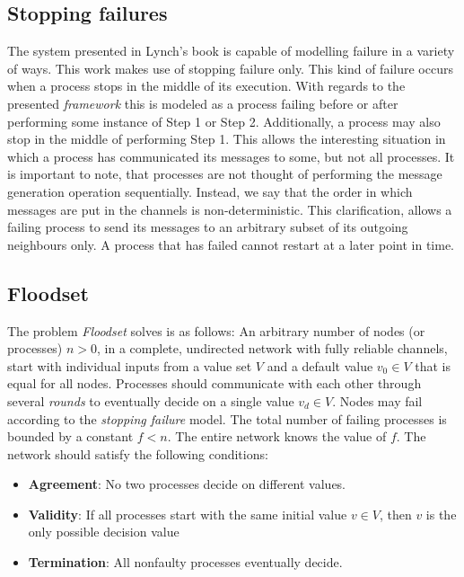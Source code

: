 \documentclass[fleqn]{article}
\begin{document}
\subsection{Stopping failures}
The system presented in Lynch's book \cite{refNancy} is capable of modelling failure in a variety of ways.
This work makes use of stopping failure only. This kind of failure occurs when a process stops in the middle of its execution. With regards to the presented \textit{framework} this
is modeled as a process failing before or after performing some instance of Step 1 or Step 2. Additionally, a process may also stop in the middle of performing Step 1. This allows
the interesting situation in which a process has communicated its messages to some, but not all processes. It is important to note, that processes are not thought of performing
the message generation operation sequentially. Instead, we say that the order in which messages are put in the channels is non-deterministic. This clarification, allows a failing process
to send its messages to an arbitrary subset of its outgoing neighbours only. A process that has failed cannot restart at a later point in time.


\subsection{Floodset}
The problem \textit{Floodset} solves is as follows: An arbitrary number of nodes (or processes) $n > 0$, in a complete, undirected network with fully reliable channels, start with individual inputs from a value set $V$ and a default value $v_0 \in V$ that is equal for all nodes. Processes should communicate with each other through several \textit{rounds} to eventually decide on a single value $v_d \in V$. Nodes may fail according to the \textit{stopping failure} model. The total number of failing processes is bounded by a constant $f < n$. The entire network knows the value of $f$.  The network should satisfy the following conditions:

\begin{itemize}
  \item \textbf{Agreement}: No two processes decide on different values.
  \item \textbf{Validity}: If all processes start with the same initial value $v \in V$, then $v$ is the only possible decision value
  \item \textbf{Termination}: All nonfaulty processes eventually decide.
\end{itemize}
\end{document}
